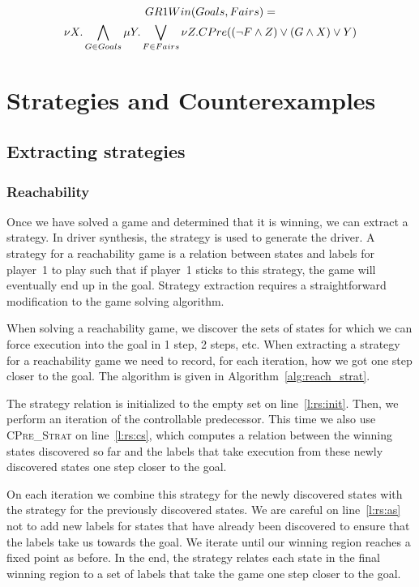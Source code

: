 \begin{multline}
    GR1Win(Goals, Fairs) = \\ \nu X. \bigwedge_{G \in Goals} \mu Y. \bigvee_{F \in Fairs} \nu Z. CPre((\neg F \wedge Z) \vee (G \wedge X) \vee Y)
\label{eqn:mu_gr1}
\end{multline}

\section{Strategies and Counterexamples}

\subsection{Extracting strategies}

\subsubsection{Reachability}

Once we have solved a game and determined that it is winning, we can extract a strategy. In driver synthesis, the strategy is used to generate the driver. A strategy for a reachability game is a relation between states and labels for player~1 to play such that if player~1 sticks to this strategy, the game will eventually end up in the goal. Strategy extraction requires a straightforward modification to the game solving algorithm.

When solving a reachability game, we discover the sets of states for which we can force execution into the goal in 1 step, 2 steps, etc. When extracting a strategy for a reachability game we need to record, for each iteration, how we got one step closer to the goal. The algorithm is given in Algorithm~\ref{alg:reach_strat}. 

The strategy relation is initialized to the empty set on line~\ref{l:rs:init}. Then, we perform an iteration of the controllable predecessor. This time we also use \textsc{CPre\_Strat} on line~\ref{l:rs:cs}, which computes a relation between the winning states discovered so far and the labels that take execution from these newly discovered states one step closer to the goal.

On each iteration we combine this strategy for the newly discovered states with the strategy for the previously discovered states. We are careful on line~\ref{l:rs:as} not to add new labels for states that have already been discovered to ensure that the labels take us towards the goal. We iterate until our winning region reaches a fixed point as before. In the end, the strategy relates each state in the final winning region to a set of labels that take the game one step closer to the goal.

